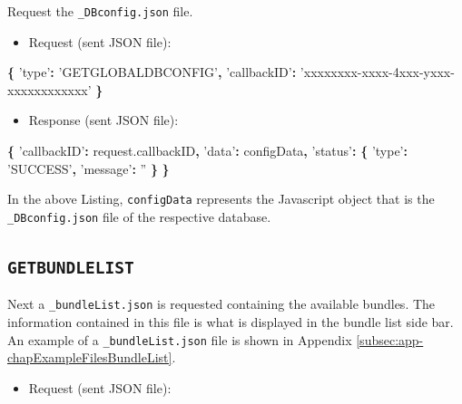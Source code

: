 \documentclass[]{book}
\newenvironment{Shaded}{\begin{snugshade}}{\end{snugshade}}
\newcommand{\AttributeTok}[1]{\textcolor[rgb]{0.77,0.63,0.00}{#1}}
\newcommand{\NormalTok}[1]{#1}
\newcommand{\OperatorTok}[1]{\textcolor[rgb]{0.81,0.36,0.00}{\textbf{#1}}}
\newcommand{\StringTok}[1]{\textcolor[rgb]{0.31,0.60,0.02}{#1}}
\newcommand{\VariableTok}[1]{\textcolor[rgb]{0.00,0.00,0.00}{#1}}
\providecommand{\tightlist}{%
  \setlength{\itemsep}{0pt}\setlength{\parskip}{0pt}}
\begin{document}
Request the \texttt{\_DBconfig.json} file.

\begin{itemize}
\tightlist
\item
  Request (sent JSON file):
\end{itemize}

\begin{Shaded}
\begin{Highlighting}[]
\OperatorTok{\{}
  \StringTok{'type'}\OperatorTok{:} \StringTok{'GETGLOBALDBCONFIG'}\OperatorTok{,}
  \StringTok{'callbackID'}\OperatorTok{:} \StringTok{'xxxxxxxx-xxxx-4xxx-yxxx-xxxxxxxxxxxx'}
\OperatorTok{\}}
\end{Highlighting}
\end{Shaded}

\begin{itemize}
\tightlist
\item
  Response (sent JSON file):
\end{itemize}

\begin{Shaded}
\begin{Highlighting}[]
\OperatorTok{\{}
  \StringTok{'callbackID'}\OperatorTok{:} \VariableTok{request}\NormalTok{.}\AttributeTok{callbackID}\OperatorTok{,}
  \StringTok{'data'}\OperatorTok{:}\NormalTok{ configData}\OperatorTok{,}
  \StringTok{'status'}\OperatorTok{:} \OperatorTok{\{}
    \StringTok{'type'}\OperatorTok{:} \StringTok{'SUCCESS'}\OperatorTok{,}
    \StringTok{'message'}\OperatorTok{:} \StringTok{''}
  \OperatorTok{\}}
\OperatorTok{\}}
\end{Highlighting}
\end{Shaded}

In the above Listing, \texttt{configData} represents the Javascript object that is the \texttt{\_DBconfig.json} file of the respective database.

\hypertarget{getbundlelist}{%
\subsection{\texorpdfstring{\texttt{GETBUNDLELIST}}{GETBUNDLELIST}}\label{getbundlelist}}

Next a \texttt{\_bundleList.json} is requested containing the available bundles. The information contained in this file is what is displayed in the bundle list side bar. An example of a \texttt{\_bundleList.json} file is shown in Appendix \ref{subsec:app-chapExampleFilesBundleList}.

\begin{itemize}
\tightlist
\item
  Request (sent JSON file):
\end{itemize}
\end{document}

